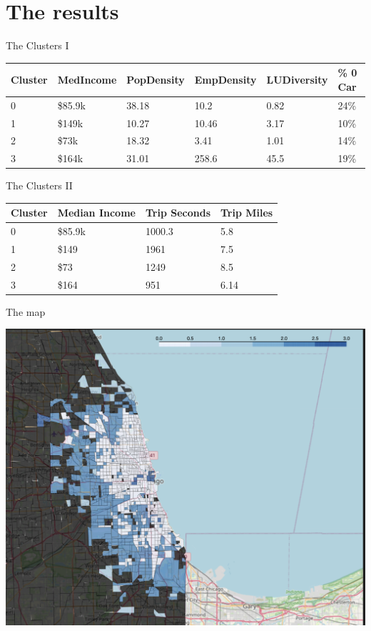 \documentclass{beamer}
\begin{document}
\section{The results}
\begin{frame}{The Clusters I}

\begin{table}[]
\begin{tabular}{@{}llllll@{}}
\toprule
Cluster & MedIncome & PopDensity & EmpDensity & LUDiversity & \% 0 Car\\ \midrule
0 & \$85.9k & 38.18 & 10.2  & 0.82 & 24\% \\
1 & \$149k  & 10.27 & 10.46 & 3.17 & 10\% \\
2 & \$73k   & 18.32 & 3.41  & 1.01 & 14\% \\
3 & \$164k  & 31.01 & 258.6 & 45.5 & 19\% \\ \bottomrule
\end{tabular}
\end{table}

\end{frame}
\begin{frame}{The Clusters II}
\begin{table}[]
\begin{tabular}{llll}
\hline
\multicolumn{1}{l|}{Cluster} & \multicolumn{1}{l|}{Median Income} & Trip Seconds & Trip Miles \\ \hline
0 & \$85.9k & 1000.3 & 5.8  \\
1 & \$149   & 1961   & 7.5  \\
2 & \$73    & 1249   & 8.5  \\
3 & \$164   & 951    & 6.14 \\ \cline{1-1} \cline{3-4} 
\end{tabular}
\end{table}
\end{frame}
\begin{frame}{The map}
	\begin{center}
	\includegraphics[scale=0.34]{map.png}
	\end{center}
\end{frame}
\end{document}
